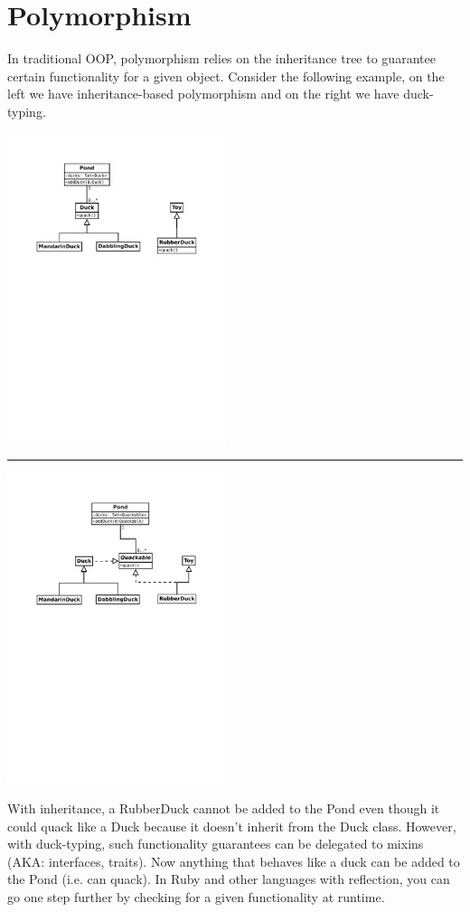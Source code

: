 \documentclass[11pt, a4paper, fleqn, oneside]{article}
\begin{document}
\section{Polymorphism}
In traditional OOP, polymorphism relies on the inheritance tree to guarantee
certain functionality for a given object. Consider the following example, 
on the left we have inheritance-based polymorphism and on the right we have
duck-typing.\\
\begin{center}
    \includegraphics[trim=25mm 170mm 25mm 25mm, clip, width=0.48\textwidth]{duck1}
    \rule{.1pt}{60mm}
    \includegraphics[trim=25mm 160mm 25mm 25mm, clip, width=0.48\textwidth]{duck2}
\end{center}
With inheritance, a RubberDuck cannot be added to the Pond even though it could quack like a Duck
because it doesn't inherit from the Duck class. However, with duck-typing, such
functionality guarantees can be delegated to mixins (AKA: interfaces, traits).
Now anything that behaves like a duck can be added to the Pond (i.e. can quack).
In Ruby and other languages with reflection, you can go one step further by
checking for a given functionality at runtime.
\end{document}
